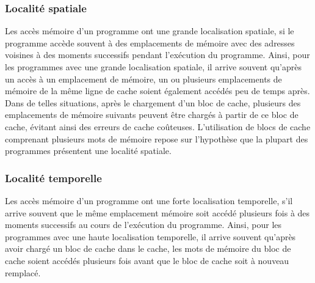\subsubsection{Localité spatiale}
%
Les accès mémoire d'un programme ont une grande localisation spatiale, si le programme accède souvent à des emplacements de mémoire avec des adresses voisines à des moments successifs pendant l'exécution du programme. 
Ainsi, pour les programmes avec une grande localisation spatiale, il arrive souvent qu'après un accès à un emplacement de mémoire, un ou plusieurs emplacements de mémoire de la même ligne de cache soient également accédés peu de temps après. 
Dans de telles situations, après le chargement d'un bloc de cache, plusieurs des emplacements de mémoire suivants peuvent être chargés à partir de ce bloc de cache, évitant ainsi des erreurs de cache coûteuses. 
L'utilisation de blocs de cache comprenant plusieurs mots de mémoire repose sur l'hypothèse que la plupart des programmes présentent une localité spatiale. \cite{Ken02}
%
\subsubsection{Localité temporelle}
%
Les accès mémoire d'un programme ont une forte localisation temporelle, s'il arrive souvent que le même emplacement mémoire soit accédé plusieurs fois à des moments successifs au cours de l'exécution du programme. 
Ainsi, pour les programmes avec une haute localisation temporelle, il arrive souvent qu'après avoir chargé un bloc de cache dans le cache, les mots de mémoire du bloc de cache soient accédés plusieurs fois avant que le bloc de cache soit à nouveau remplacé. \cite{Ken02}
